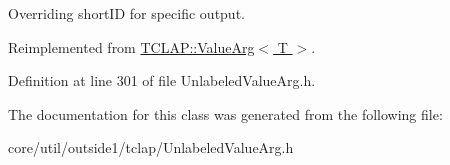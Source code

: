 Overriding short\+ID for specific output. 

Reimplemented from \hyperlink{classTCLAP_1_1ValueArg_abb1eb22814d0a0da49c5f8bb57362d09}{T\+C\+L\+A\+P\+::\+Value\+Arg$<$ T $>$}.



Definition at line 301 of file Unlabeled\+Value\+Arg.\+h.



The documentation for this class was generated from the following file\+:\begin{DoxyCompactItemize}
\item 
core/util/outside1/tclap/Unlabeled\+Value\+Arg.\+h\end{DoxyCompactItemize}
